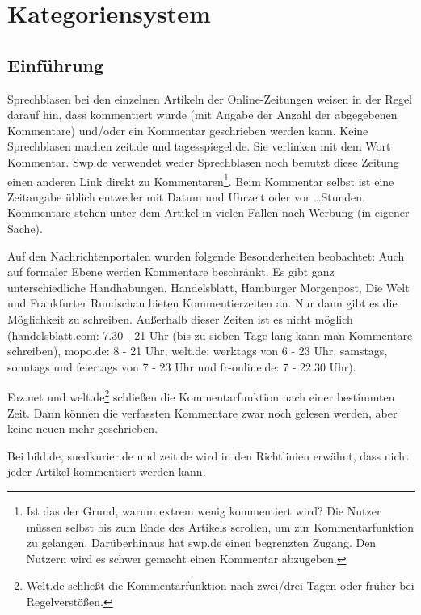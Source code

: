 \chapter{Kategoriensystem}


\section{Einführung}

Sprechblasen bei den einzelnen Artikeln der Online-Zeitungen weisen in der Regel darauf hin, dass kommentiert wurde
(mit Angabe der Anzahl der abgegebenen Kommentare) und/oder ein Kommentar
geschrieben werden kann. Keine Sprechblasen machen zeit.de und tagesspiegel.de. Sie verlinken mit dem Wort
\glqq Kommentar\grqq. Swp.de verwendet weder Sprechblasen noch benutzt diese Zeitung einen anderen 
Link direkt zu Kommentaren\footnote{Ist das der Grund, warum extrem wenig kommentiert wird? Die Nutzer 
müssen selbst bis zum Ende
des Artikels scrollen, um zur Kommentarfunktion zu gelangen. Darüberhinaus hat swp.de einen begrenzten Zugang. 
Den Nutzern wird es schwer gemacht einen Kommentar abzugeben.}.
Beim Kommentar selbst ist eine Zeitangabe üblich
entweder mit Datum und Uhrzeit oder \glqq vor \ldots Stunden\grqq.  Kommentare
stehen unter dem Artikel in vielen Fällen nach Werbung (in eigener Sache).

Auf den Nachrichtenportalen wurden folgende Besonderheiten beobachtet:
Auch auf formaler Ebene werden Kommentare beschränkt. Es gibt ganz
unterschiedliche Handhabungen. Handelsblatt, Hamburger Morgenpost, Die Welt und Frankfurter Rundschau bieten Kommentierzeiten an. 
Nur dann gibt es die Möglichkeit zu schreiben. Außerhalb dieser Zeiten ist es nicht
möglich (handelsblatt.com: 7.30 - 21 Uhr (bis zu sieben Tage lang kann man Kommentare schreiben), mopo.de: 8 - 21 Uhr, 
welt.de: werktags von 6 - 23 Uhr, samstags, sonntags und feiertags von 7 - 23 Uhr und fr-online.de: 7 - 22.30 Uhr).

Faz.net und welt.de\footnote{Welt.de schließt die Kommentarfunktion nach zwei/drei Tagen oder früher bei
  Regelverstößen.} schließen die Kommentarfunktion nach einer bestimmten
Zeit. Dann können die verfassten Kommentare zwar noch gelesen werden, aber keine
neuen mehr geschrieben. 

Bei  bild.de, suedkurier.de und zeit.de wird in den Richtlinien erwähnt, dass nicht jeder Artikel
kommentiert werden kann.

